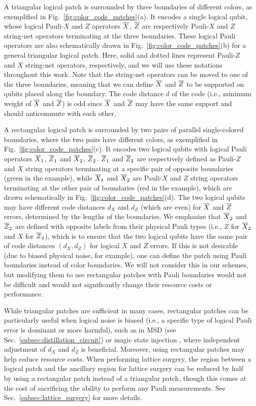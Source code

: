 \documentclass[
 prx,
 reprint,
 superscriptaddress,
 longbibliography,
 dvipsnames
]{revtex4-2}
\begin{document}
A triangular logical patch is surrounded by three boundaries of different colors, as exemplified in Fig.~\ref{fig:color_code_patches}(a).
It encodes a single logical qubit, whose logical Pauli-$X$ and $Z$ operators $\overline{X}$, $\overline{Z}$ are respectively Pauli-$X$ and $Z$ string-net operators terminating at the three boundaries.
These logical Pauli operators are also schematically drawn in Fig.~\ref{fig:color_code_patches}(b) for a general triangular logical patch.
Here, solid and dotted lines represent Pauli-$Z$ and $X$ string-net operators, respectively, and we will use these notations throughout this work.
Note that the string-net operators can be moved to one of the three boundaries, meaning that we can define $\overline{X}$ and $\overline{Z}$ to be supported on qubits placed along the boundary.
The code distance $d$ of the code (i.e., minimum weight of $\overline{X}$ and $\overline{Z}$) is odd since $\overline{X}$ and $\overline{Z}$ may have the same support and should anticommute with each other.

A rectangular logical patch is surrounded by two pairs of parallel single-colored boundaries, where the two pairs have different colors, as exemplified in Fig.~\ref{fig:color_code_patches}(c).
It encodes two logical qubits with logical Pauli operators $\overline{X}_1$, $\overline{Z}_1$ and $\overline{X}_2$, $\overline{Z}_2$.
$\overline{Z}_1$ and $\overline{Z}_2$ are respectively defined as Pauli-$Z$ and $X$ string operators terminating at a specific pair of opposite boundaries (green in the example), while $\overline{X}_1$ and $\overline{X}_2$ are Pauli-$X$ and $Z$ string operators terminating at the other pair of boundaries (red in the example), which are drawn schematically in Fig.~\ref{fig:color_code_patches}(d).
The two logical qubits may have different code distances $d_X$ and $d_Z$ (which are even) for $\overline{X}$ and $\overline{Z}$ errors, determined by the lengths of the boundaries.
We emphasize that $\overline{X}_2$ and $\overline{Z}_2$ are defined with opposite labels from their physical Pauli types (i.e., $Z$ for $\overline{X}_2$ and $X$ for $\overline{Z}_2$), which is to ensure that the two logical qubits have the same pair of code distances $(d_X, d_Z)$ for logical $X$ and $Z$ errors.
If this is not desirable (due to biased physical noise, for example), one can define the patch using Pauli boundaries \cite{kesselring2018boundaries,thomsen2024low} instead of color boundaries.
We will not consider this in our schemes, but modifying them to use rectangular patches with Pauli boundaries would not be difficult and would not significantly change their resource costs or performance.

While triangular patches are sufficient in many cases, rectangular patches can be particularly useful when logical noise is biased (i.e., a specific type of logical Pauli error is dominant or more harmful), such as in MSD (see Sec.~\ref{subsec:distillation_circuit}) or magic state injection \cite{fazio2024logical}, where independent adjustment of $d_X$ and $d_Z$ is beneficial. 
Moreover, using rectangular patches may help reduce resource costs. 
When performing lattice surgery, the region between a logical patch and the ancillary region for lattice surgery can be reduced by half by using a rectangular patch instead of a triangular patch, though this comes at the cost of sacrificing the ability to perform any Pauli measurements. 
See Sec.~\ref{subsec:lattice_surgery} for more details.
\end{document}

